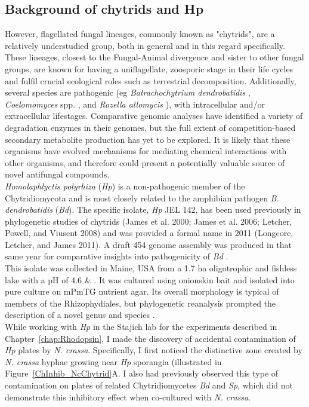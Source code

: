 \subsection{Background of chytrids and Hp}
However, flagellated fungal lineages, commonly known as "chytrids", are a relatively understudied group, both in general and in this regard specifically. These lineages, closest to the Fungal-Animal divergence and sister to other fungal groups, are known for having a uniflagellate, zoosporic stage in their life cycles and fulfil crucial ecological roles such as terrestrial decomposition. Additionally, several species are pathogenic (eg \textit{Batrachochytrium dendrobatidis} \cite{Longcore1999}, \textit{Coelomomyces} spp. \cite{Couch1972}, and \textit{Rozella allomycis} \cite{James2013}), with intracellular and/or extracellular lifestages. Comparative genomic analyses have identified a variety of degradation enzymes in their genomes, but the full extent of competition-based secondary metabolite production has yet to be explored. It is likely that these organisms have evolved mechanisms for mediating chemical interactions with other organisms, and therefore could present a potentially valuable source of novel antifungal compounds.\\
\indent \textit{Homolaphlyctis polyrhiza} (\textit{Hp}) is a non-pathogenic member of the Chytridiomycota and is most closely related to the amphibian pathogen \textit{B. dendrobatidis} (\textit{Bd}). The specific isolate, \textit{Hp} JEL 142, has been used previously in phylogenetic studies of chytrids (James et al. 2000; James et al. 2006; Letcher, Powell, and Viusent 2008) and was provided a formal name in 2011 (Longcore, Letcher, and James 2011). A draft 454 genome assembly was produced in that same year for comparative insights into pathogenicity of \textit{Bd} \cite{Joneson2011}.\\
\indent This isolate was collected in Maine, USA from a 1.7 ha oligotrophic and fishless lake with a pH of 4.6 \cite{Davis1994} \& \cite{Rhodes1995}. It was cultured using onionskin bait and isolated into pure culture on mPmTG nutrient agar. Its overall morphology is typical of members of the Rhizophydiales, but phylogenetic reanalysis prompted the description of a novel genus and species \cite{Longcore2011}.\\
\indent While working with \textit{Hp} in the Stajich lab for the experiments described in Chapter~\ref{chap:Rhodopsin}, I made the discovery of accidental contamination of \textit{Hp} plates by \textit{N. crassa}. Specifically, I first noticed the distinctive zone created by \textit{N. crassa} hyphae growing near \textit{Hp} sporangia (illustrated in Figure~\ref{ChInhib_NcChytrid}A. I also had previously observed this type of contamination on plates of related Chytridiomycetes \textit{Bd} and \textit{Sp}, which did not demonstrate this inhibitory effect when co-cultured with \textit{N. crassa}.\\
